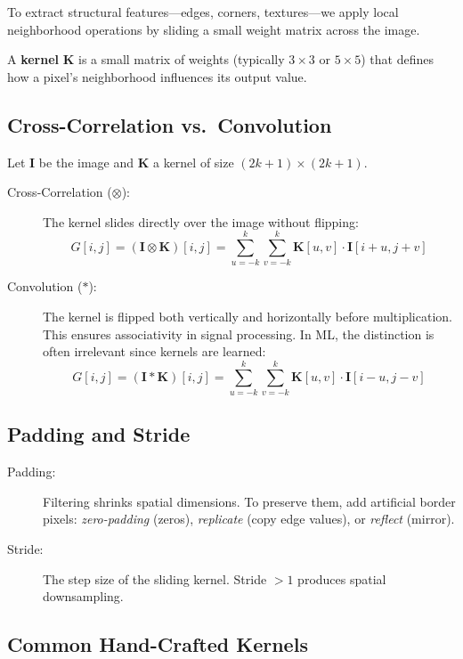 To extract structural features---edges, corners, textures---we apply local neighborhood operations by sliding a small weight matrix across the image.

\begin{definition}
A \textbf{kernel} $\mathbf{K}$ is a small matrix of weights (typically $3 \times 3$ or $5 \times 5$) that defines how a pixel's neighborhood influences its output value.
\end{definition}

\subsection*{Cross-Correlation vs.\ Convolution}

Let $\mathbf{I}$ be the image and $\mathbf{K}$ a kernel of size $(2k+1) \times (2k+1)$.

\begin{description}
    \item[Cross-Correlation ($\otimes$):] The kernel slides directly over the image without flipping:
    $$ G[i, j] = (\mathbf{I} \otimes \mathbf{K})[i, j] = \sum_{u=-k}^{k} \sum_{v=-k}^{k} \mathbf{K}[u, v] \cdot \mathbf{I}[i+u, j+v] $$
    \item[Convolution ($*$):] The kernel is flipped both vertically and horizontally before multiplication. This ensures associativity in signal processing. In ML, the distinction is often irrelevant since kernels are learned:
    $$ G[i, j] = (\mathbf{I} * \mathbf{K})[i, j] = \sum_{u=-k}^{k} \sum_{v=-k}^{k} \mathbf{K}[u, v] \cdot \mathbf{I}[i-u, j-v] $$
\end{description}

\subsection*{Padding and Stride}
\begin{description}
    \item[Padding:] Filtering shrinks spatial dimensions. To preserve them, add artificial border pixels: \textit{zero-padding} (zeros), \textit{replicate} (copy edge values), or \textit{reflect} (mirror).
    \item[Stride:] The step size of the sliding kernel. Stride $> 1$ produces spatial downsampling.
\end{description}

\subsection*{Common Hand-Crafted Kernels}

